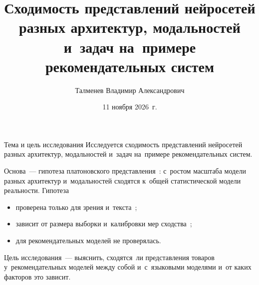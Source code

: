 \documentclass[t,aspectratio=169,11pt,hyperref={unicode}]{beamer}
\title[Сходимость представлений нейросетей]{Сходимость представлений нейросетей
  разных архитектур, модальностей и~задач на~примере рекомендательных систем}
\author[Талменев В.\,А.]{Талменев Владимир Александрович}
\institute{Центральный университет\\Научный трек}
\date{11 ноября 2026~г.}
\begin{document}
\nocite{huh2024platonic,koepke2026cave,groger2026aristotelian,jha2025vec2vec,
  balestriero2026jepa,maniparambil2024,sharma2024checkup,merullo2023linearly,
  moschella2023relative,bansal2021stitching,dravid2023rosetta,ainsworth2023rebasin,
  abdou2021color,kornblith2019cka,klabunde2025survey,davari2023cka,
  sucholutsky2023aligned,kang2018sasrec,sun2019bert4rec,xie2022cl4srec,
  hou2022unisrec,li2023recformer,yuan2023idvsmodality,sheng2025alpharec,
  collins2025complementarity,zhang2023collm,liao2024llara,zhai2024hstu,
  rajput2023tiger,lin2024dreamumm,iana2024peeling,oord2018cpc,levy2014implicit,
  barkan2016item2vec,radford2021clip,oquab2024dinov2,lenc2015equivariance}

\begin{frame}
\titlepage
\end{frame}

\begin{frame}{Тема и цель исследования}
Исследуется сходимость представлений нейросетей разных архитектур, модальностей
и~задач на~примере рекомендательных систем.

\medskip
Основа~--- гипотеза платоновского представления~\cite{huh2024platonic}: с~ростом
масштаба модели разных архитектур и~модальностей сходятся к~общей статистической
модели реальности. Гипотеза
\begin{itemize}
  \item проверена только для зрения и~текста~\cite{huh2024platonic,maniparambil2024};
  \item зависит от размера выборки и~калибровки мер
    сходства~\cite{koepke2026cave,groger2026aristotelian};
  \item для рекомендательных моделей не проверялась.
\end{itemize}

\medskip
\begin{block}{Цель исследования~---}
выяснить, сходятся~ли представления товаров у~рекомендательных моделей между собой
и~с~языковыми моделями и~от каких факторов это зависит.
\end{block}
\end{frame}
\end{document}
